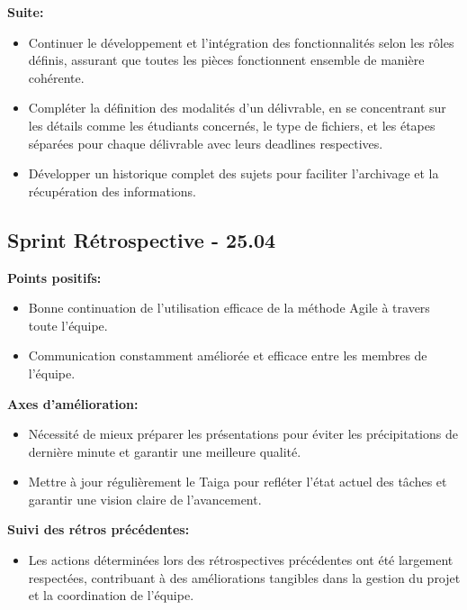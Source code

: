 \documentclass[11pt]{article}
\begin{document}
\textbf{Suite:}
\begin{itemize}
  \item Continuer le développement et l'intégration des fonctionnalités selon les rôles définis, assurant que toutes les pièces fonctionnent ensemble de manière cohérente.
  \item Compléter la définition des modalités d'un délivrable, en se concentrant sur les détails comme les étudiants concernés, le type de fichiers, et les étapes séparées pour chaque délivrable avec leurs deadlines respectives.
  \item Développer un historique complet des sujets pour faciliter l'archivage et la récupération des informations.
\end{itemize}











\subsection*{{\color{navy}Sprint Rétrospective - 25.04}}

\textbf{Points positifs:}
\begin{itemize}
  \item Bonne continuation de l'utilisation efficace de la méthode Agile à travers toute l'équipe.
  \item Communication constamment améliorée et efficace entre les membres de l'équipe.
\end{itemize}

\textbf{Axes d'amélioration:}
\begin{itemize}
  \item Nécessité de mieux préparer les présentations pour éviter les précipitations de dernière minute et garantir une meilleure qualité.
  \item Mettre à jour régulièrement le Taiga pour refléter l'état actuel des tâches et garantir une vision claire de l'avancement.
\end{itemize}

\textbf{Suivi des rétros précédentes:}
\begin{itemize}
  \item Les actions déterminées lors des rétrospectives précédentes ont été largement respectées, contribuant à des améliorations tangibles dans la gestion du projet et la coordination de l'équipe.
\end{itemize}
\end{document}

